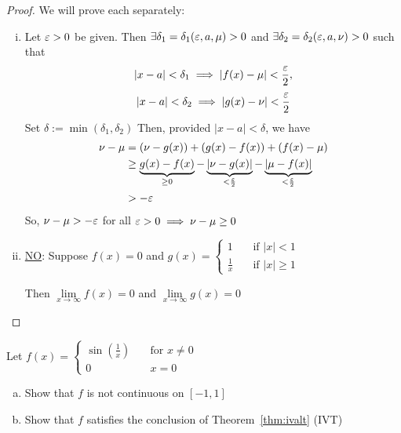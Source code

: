 \begin{proof}
    We will prove each separately:
    \begin{enumerate}[(i)]
    \item Let $\varepsilon > 0$ be given. Then $\exists \delta_1 = \delta_1(\varepsilon, a, \mu) > 0$ and 
        $\exists \delta_2 = \delta_2(\varepsilon, a, \nu) > 0$ such that 
        $$ |x-a| < \delta_1 \implies |f(x) - \mu| < \frac{\varepsilon}{2},$$ 
        $$ |x-a| < \delta_2 \implies |g(x) - \nu| < \frac{\varepsilon}{2}$$
        Set $\delta := \min(\delta_1, \delta_2)$
        Then, provided $|x-a| < \delta$, we have 
        \begin{align*}
            \nu - \mu &= (\nu - g(x)) + (g(x) - f(x)) + (f(x) - \mu) \\
            &\geq \underbrace{g(x) - f(x)}_{\geq 0} - \underbrace{|\nu - g(x)|}_{<\frac{\varepsilon}{2}} - \underbrace{|\mu - f(x)|}_{<\frac{\varepsilon}{2}} \\
            &> -\varepsilon
        \end{align*}
        So, $\nu - \mu > -\varepsilon$ for all $\varepsilon > 0 \implies \nu - \mu \geq 0$
    \item \underline{NO}: Suppose $f(x) = 0$ and $g(x) = \begin{cases}
        1       & \quad \text{if } |x| < 1\\
        \frac{1}{x}& \quad \text{if } |x| \geq 1
        \end{cases}$

        Then $\lim\limits_{x\to \infty} f(x) = 0$ and $\lim\limits_{x\to \infty} g(x) = 0$
    \end{enumerate}
\end{proof}

\begin{example}
    Let $f(x) = \begin{cases}
        \sin\left(\frac{1}{x}\right)       & \quad \text{for } x \neq 0\\
        0 & \quad x = 0
        \end{cases}$
    \begin{enumerate}[(a)]
        \item Show that $f$ is not continuous on $\left[-1, 1\right]$
        \item Show that $f$ satisfies the conclusion of Theorem~\ref{thm:ivalt} (IVT)
    \end{enumerate}
\end{example}

